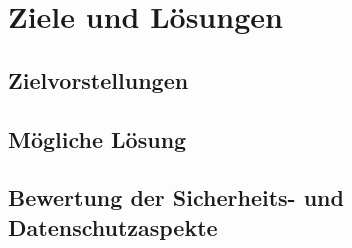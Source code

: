 \section{Ziele und Lösungen}
\subsection{Zielvorstellungen}
\subsection{Mögliche Lösung}
\subsection{Bewertung der Sicherheits- und Datenschutzaspekte}